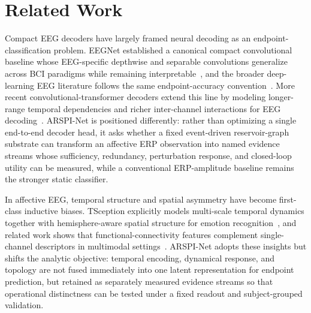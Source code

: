 \documentclass[journal]{IEEEtran}
\begin{document}
\section{Related Work}
Compact EEG decoders have largely framed neural decoding as an endpoint-classification problem. EEGNet established a canonical compact convolutional baseline whose EEG-specific depthwise and separable convolutions generalize across BCI paradigms while remaining interpretable~\cite{lawhern2018eegnet}, and the broader deep-learning EEG literature follows the same endpoint-accuracy convention~\cite{craik2019deep,delpup2025preprocessing}. More recent convolutional-transformer decoders extend this line by modeling longer-range temporal dependencies and richer inter-channel interactions for EEG decoding~\cite{ding2024eegdeformer}. ARSPI-Net is positioned differently: rather than optimizing a single end-to-end decoder head, it asks whether a fixed event-driven reservoir-graph substrate can transform an affective ERP observation into named evidence streams whose sufficiency, redundancy, perturbation response, and closed-loop utility can be measured, while a conventional ERP-amplitude baseline remains the stronger static classifier.

In affective EEG, temporal structure and spatial asymmetry have become first-class inductive biases. TSception explicitly models multi-scale temporal dynamics together with hemisphere-aware spatial structure for emotion recognition~\cite{ding2023tsception}, and related work shows that functional-connectivity features complement single-channel descriptors in multimodal settings~\cite{wu2022connectivity,guo2025mma,chiang2023depression}. ARSPI-Net adopts these insights but shifts the analytic objective: temporal encoding, dynamical response, and topology are not fused immediately into one latent representation for endpoint prediction, but retained as separately measured evidence streams so that operational distinctness can be tested under a fixed readout and subject-grouped validation.
\end{document}
